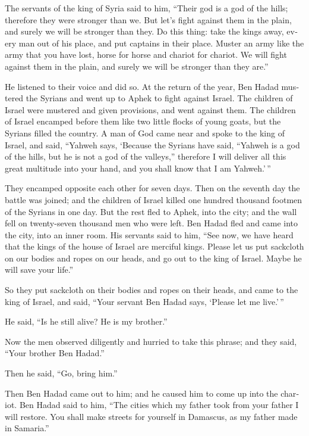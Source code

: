 \begin{paracol}{2}
\begin{otherlanguage}{english}
 The servants of the king of Syria said to him, ``Their
god is a god of the hills; therefore they were stronger than we. But
let's fight against them in the plain, and surely we will be stronger
than they.  Do this thing: take the kings away, every man
out of his place, and put captains in their place. 
Muster an army like the army that you have lost, horse for horse and
chariot for chariot. We will fight against them in the plain, and surely
we will be stronger than they are.''

He listened to their voice and did so.  At the return of
the year, Ben Hadad mustered the Syrians and went up to Aphek to fight
against Israel.  The children of Israel were mustered and
given provisions, and went against them. The children of Israel encamped
before them like two little flocks of young goats, but the Syrians
filled the country.  A man of God came near and spoke to
the king of Israel, and said, ``Yahweh says, `Because the Syrians have
said, ``Yahweh is a god of the hills, but he is not a god of the
valleys,'' therefore I will deliver all this great multitude into your
hand, and you shall know that I am Yahweh.'\,''

 They encamped opposite each other for seven days. Then
on the seventh day the battle was joined; and the children of Israel
killed one hundred thousand footmen of the Syrians in one day.
 But the rest fled to Aphek, into the city; and the wall
fell on twenty-seven thousand men who were left. Ben Hadad fled and came
into the city, into an inner room.  His servants said to
him, ``See now, we have heard that the kings of the house of Israel are
merciful kings. Please let us put sackcloth on our bodies and ropes on
our heads, and go out to the king of Israel. Maybe he will save your
life.''

 So they put sackcloth on their bodies and ropes on their
heads, and came to the king of Israel, and said, ``Your servant Ben
Hadad says, `Please let me live.'\,''

He said, ``Is he still alive? He is my brother.''

 Now the men observed diligently and hurried to take this
phrase; and they said, ``Your brother Ben Hadad.''

Then he said, ``Go, bring him.''

Then Ben Hadad came out to him; and he caused him to come up into the
chariot.  Ben Hadad said to him, ``The cities which my
father took from your father I will restore. You shall make streets for
yourself in Damascus, as my father made in Samaria.''


\end{otherlanguage}
\end{paracol}
